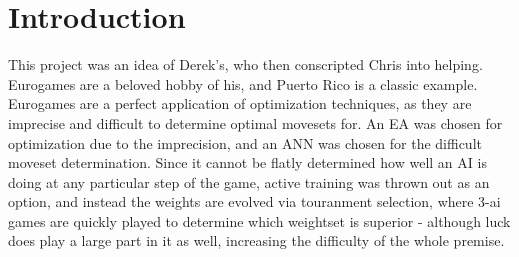 
\chapter{Introduction}

This project was an idea of Derek's, who then conscripted Chris into helping.  Eurogames are a beloved hobby of his, and Puerto Rico is a classic example.  Eurogames are a perfect application of optimization techniques, as they are imprecise and difficult to determine optimal movesets for.  An EA was chosen for optimization due to the imprecision, and an ANN was chosen for the difficult moveset determination.  Since it cannot be flatly determined how well an AI is doing at any particular step of the game, active training was thrown out as an option, and instead the weights are evolved via touranment selection, where 3-ai games are quickly played to determine which weightset is superior - although luck does play a large part in it as well, increasing the difficulty of the whole premise. 